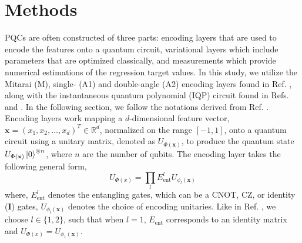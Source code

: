 \documentclass[journal=jacsat,manuscript=article]{achemso}
\begin{document}
\section{Methods}
PQCs are often constructed of three parts: encoding layers that are used to encode the features onto a quantum circuit, variational layers which include parameters that are optimized classically, and measurements which provide numerical estimations of the regression target values.\citep{suzuki_predicting_2020} 
In this study, we utilize the Mitarai (M)\cite{mitarai_quantum_2018}, single- (A1) and double-angle (A2) encoding layers found in Ref. \citep{suzuki_predicting_2020}, along with the instantaneous quantum polynomial (IQP) circuit found in Refs. \citep{bremner_average-case_2016} and \citep{havlicek_supervised_2019}.
In the following section, we follow the notations derived from  Ref. \citep{suzuki_predicting_2020}.
Encoding layers work mapping a $d$-dimensional feature vector, $\mathbf{x}=(x_{1}, x_{2}, \ldots, x_{d})^{T} \in \mathbb{R}^{d}$, normalized on the range $[-1,1]$, onto a quantum circuit using a unitary matrix, denoted as $U_{\Phi(\mathbf{x})}$, to produce the quantum state $U_{\Phi(\mathbf{x})}\ket{0}^{\otimes n}$, where $n$ are the number of qubits.
The encoding layer takes the following general form,
\begin{equation}
	U_{\Phi(x)} =  \prod_{l} E_{\text{ent}}^{l} U_{\phi_{l}(\mathbf{x})}
	\label{eq:general_encoding}
\end{equation}
where, $E_{\text{ent}}^{l}$ denotes the entangling gates, which can be a CNOT, CZ, or identity ($\mathbf{I}$) gates,   $U_{\phi_{l}(\mathbf{x})}$ denotes the choice of encoding unitaries. 
Like in  Ref. \citep{suzuki_predicting_2020}, we choose $l \in \{1, 2\}$, such that when $l=1$, $E_{\text{ent}}$ corresponds to an identity matrix and $U_{\Phi(x)} = U_{\phi_{1}(\mathbf{x})}$.
\end{document}
